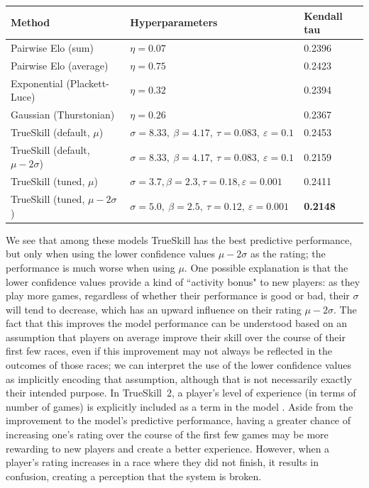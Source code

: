 \documentclass{article}
\begin{document}
	\begin{center}
		\begin{tabular}{l|l|l}
		Method & Hyperparameters & Kendall tau \\ \hline
		Pairwise Elo (sum) & $\scriptstyle \eta=0.07$ & 0.2396 \\
		Pairwise Elo (average) & $\scriptstyle \eta=0.75$ & 0.2423 \\
		Exponential (Plackett-Luce) & $\scriptstyle \eta=0.32$ & 0.2394 \\
		Gaussian (Thurstonian) & $\scriptstyle \eta=0.26$ & 0.2367 \\
		TrueSkill (default, $\mu$) &$\scriptstyle \sigma=8.33,\ \beta=4.17,\ \tau=0.083,\ \varepsilon=0.1$ & 0.2453 \\
		TrueSkill (default, $\mu - 2\sigma$) & $\scriptstyle \sigma=8.33,\ \beta=4.17,\ \tau=0.083,\ \varepsilon=0.1$ & 0.2159 \\
		TrueSkill (tuned, $\mu$) & $\scriptstyle \sigma=3.7, \beta=2.3, \tau=0.18, \varepsilon=0.001$ & 0.2411 \\
		TrueSkill (tuned, $\mu - 2\sigma$) & $\scriptstyle \sigma=5.0,\ \beta=2.5,\ \tau=0.12,\ \varepsilon=0.001$ & \textbf{0.2148}
		\end{tabular}
	\end{center}
	
	We see that among these models TrueSkill has the best predictive performance, but only when using the lower confidence values $\mu - 2\sigma$ as the rating; the performance is much worse when using $\mu$. One possible explanation is that the lower confidence values provide a kind of ``activity bonus" to new players: as they play more games, regardless of whether their performance is good or bad, their $\sigma$ will tend to decrease, which has an upward influence on their rating $\mu - 2\sigma$. The fact that this improves the model performance can be understood based on an assumption that players on average improve their skill over the course of their first few races, even if this improvement may not always be reflected in the outcomes of those races; we can interpret the use of the lower confidence values as implicitly encoding that assumption, although that is not necessarily exactly their intended purpose. In TrueSkill~2, a player's level of experience (in terms of number of games) is explicitly included as a term in the model \cite{minka2018trueskill}. Aside from the improvement to the model's predictive performance, having a greater chance of increasing one's rating over the course of the first few games may be more rewarding to new players and create a better experience. However, when a player's rating increases in a race where they did not finish, it results in confusion, creating a perception that the system is broken.
	
\end{document}
